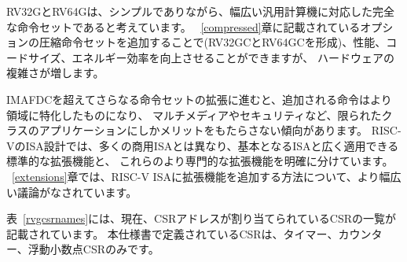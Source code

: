 \begin{comment}
We believe RV32G and RV64G provide simple but complete instruction
sets for a broad range of general-purpose computing.  The optional
compressed instruction set described in Chapter~\ref{compressed} can
be added (forming RV32GC and RV64GC) to improve performance, code
size, and energy efficiency, though with some additional hardware
complexity.
\end{comment}
RV32GとRV64Gは、シンプルでありながら、幅広い汎用計算機に対応した完全な命令セットであると考えています。
~\ref{compressed}章に記載されているオプションの圧縮命令セットを追加することで(RV32GCとRV64GCを形成)、性能、コードサイズ、エネルギー効率を向上させることができますが、
ハードウェアの複雑さが増します。

\begin{comment}
As we move beyond IMAFDC into further instruction-set extensions, the
added instructions tend to be more domain-specific and only provide
benefits to a restricted class of applications, e.g., for multimedia
or security.  Unlike most commercial ISAs, the RISC-V ISA design
clearly separates the base ISA and broadly applicable standard
extensions from these more specialized additions.
Chapter~\ref{extensions} has a more extensive discussion of ways to
add extensions to the RISC-V ISA.
\end{comment}
IMAFDCを超えてさらなる命令セットの拡張に進むと、追加される命令はより領域に特化したものになり、
マルチメディアやセキュリティなど、限られたクラスのアプリケーションにしかメリットをもたらさない傾向があります。
RISC-VのISA設計では、多くの商用ISAとは異なり、基本となるISAと広く適用できる標準的な拡張機能と、
これらのより専門的な拡張機能を明確に分けています。
~\ref{extensions}章では、RISC-V ISAに拡張機能を追加する方法について、より幅広い議論がなされています。



\FloatBarrier
\begin{comment}
Table~\ref{rvgcsrnames} lists the CSRs that have
currently been allocated CSR addresses.  The timers, counters, and
floating-point CSRs are the only CSRs defined in this specification.
\end{comment}
表~\ref{rvgcsrnames}には、現在、CSRアドレスが割り当てられているCSRの一覧が記載されています。
本仕様書で定義されているCSRは、タイマー、カウンター、浮動小数点CSRのみです。


